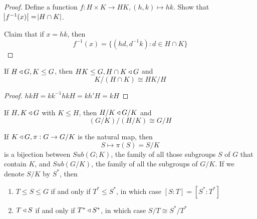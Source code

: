 \documentclass[11pt]{article}
\begin{document}
\begin{proof}
Define a function \(f:H\times K\to HK,(h,k)\mapsto hk\). Show that
\(\abs{f^{-1}(x)}=\abs{H\cap K}\). 

Claim that if \(x=hk\), then
\begin{equation*}
f^{-1}(x)=\{(hd,d^{-1}k):d\in H\cap K\}
\end{equation*}
\end{proof}

\begin{theorem}
If \(H\triangleleft G, K\le G\), then \(HK\le G,H\cap K\triangleleft G\) and
\begin{equation*}
K/(H\cap K)\cong HK/H
\end{equation*}
\end{theorem}

\begin{proof}
\(hkH=kk^{-1}hkH=kh'H=kH\)
\end{proof}

\begin{theorem}
If \(H,K\triangleleft G\) with \(K\le H\), then \(H/K\triangleleft G/K\) and
\begin{equation*}
(G/K)/(H/K)\cong G/H
\end{equation*}
\end{theorem}

\begin{theorem}
\label{thm2.76}
If \(K\triangleleft G, \pi:G\to G/K\) is the natural map, then
\begin{equation*}
S\mapsto \pi(S)=S/K
\end{equation*}
is a bijection between \(Sub(G;K)\), the family of all those subgroups \(S\) of
\(G\) that contain \(K\), and \(Sub(G/K)\), the family of all the subgroups of
\(G/K\). If we denote \(S/K\) by \(S^*\), then
\begin{enumerate}
\item \(T\le S\le G\) if and only if \(T^*\le S^*\), in which case \([S:T]=[S^*:T^*]\)
\item \(T\triangleleft S\) if and only if \(T^*\triangleleft S^*\), in which case \(S/T\cong S^*/T^*\)
\end{enumerate}
\end{theorem}

\begin{center}
\end{center}
\end{document}
